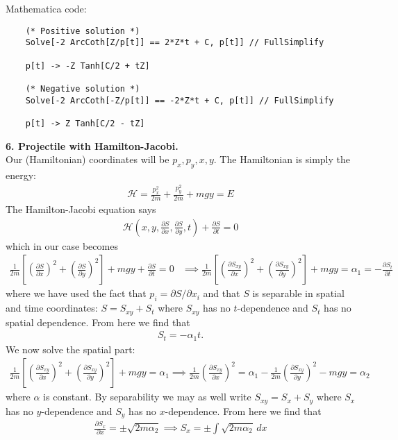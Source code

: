 \documentclass{article}
\theoremstyle{definition}
\newcommand{\p}{\partial}
\newcommand{\ham}{\mathcal{H}}
\newcommand{\al}{\alpha}
\newcommand{\f}[2]{\frac{#1}{#2}}
\newcommand{\lp}{\left(}
\newcommand{\rp}{\right)}
\newcommand{\lb}{\left[}
\newcommand{\rb}{\right]}
\begin{document}
\begin{enumerate}[label=(\alph*)]
	Mathematica code:
	\begin{lstlisting}
	(* Positive solution *)
	Solve[-2 ArcCoth[Z/p[t]] == 2*Z*t + C, p[t]] // FullSimplify
	
	p[t] -> -Z Tanh[C/2 + tZ]
	
	(* Negative solution *)
	Solve[-2 ArcCoth[-Z/p[t]] == -2*Z*t + C, p[t]] // FullSimplify
	
	p[t] -> Z Tanh[C/2 - tZ]
	\end{lstlisting}
	
\end{enumerate}




\noindent \textbf{6. Projectile with Hamilton-Jacobi.}\\

\noindent Our (Hamiltonian) coordinates will be $p_x, p_y, x,y$. The Hamiltonian is simply the energy:
\begin{align*}
\ham = \f{p_x^2}{2m} + \f{p_y^2}{2m} + mgy = E
\end{align*}
The Hamilton-Jacobi equation says 
\begin{align*}
\ham \lp x,y, \f{\p S}{\p x}, \f{\p S}{\p y}, t \rp + \f{\p S}{\p t} = 0
\end{align*}
which in our case becomes
\begin{align*}
\f{1}{2m} \lb \lp \f{\p S}{\p x} \rp^2 + \lp\f{\p S}{\p y}\rp^2 \rb + mgy + \f{\p S}{\p t} = 0 &\implies 
\f{1}{2m} \lb \lp \f{\p S_{xy}}{\p x} \rp^2 + \lp\f{\p S_{xy}}{\p y}\rp^2 \rb + mgy  = \al_1 = -\f{\p S_t}{\p t}
\end{align*}
where we have used the fact that $p_i = \p S / \p x_i$ and that $S$ is separable in spatial and time coordinates: $S = S_{xy} + S_t$ where $S_{xy}$ has no $t$-dependence and $S_t$ has no spatial dependence. From here we find that
\begin{align*}
S_t = -\al_1 t.
\end{align*}
We now solve the spatial part:
\begin{align*}
\f{1}{2m} \lb \lp \f{\p S_{xy}}{\p x} \rp^2 + \lp\f{\p S_{xy}}{\p y}\rp^2 \rb + mgy  = \al_1 \implies \f{1}{2m}\lp  \f{\p S_{xy}}{\p x}\rp^2  =  \al_1 - \f{1}{2m}\lp \f{\p S_{xy}}{\p y} \rp^2 -mgy = \al_2
\end{align*}
where $\al$ is constant. By separability we may as well write $S_{xy} = S_x + S_y$ where $S_x$ has no $y$-dependence and $S_y$ has no $x$-dependence. From here we find that 
\begin{align*}
\f{\p S_x}{\p x} = \pm\sqrt{2m \al_2 } \implies S_x = \pm \int \sqrt{2m\al_2}\,dx
\end{align*}
\end{document}
